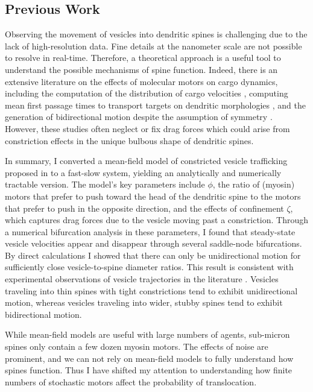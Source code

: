 \documentclass[a4paper,11pt]{article}
\begin{document}
\subsection{Previous Work}

Observing the movement of vesicles into dendritic spines is challenging due to the lack of high-resolution data. Fine details at the nanometer scale are not possible to resolve in real-time. Therefore, a theoretical approach is a useful tool to understand the possible mechanisms of spine function. Indeed, there is an extensive literature on the effects of molecular motors on cargo dynamics, including the computation of the distribution of cargo velocities \cite{muller2008tug,kunwar2011mechanical}, computing mean first passage times to transport targets on dendritic morphologies \cite{bressloff2009directed,newby2009directed,newby2010random,newby2011asymptotic,bressloff2013metastability}, and the generation of bidirectional motion despite the assumption of symmetry \cite{julicher1995cooperative,guerin2011motion,allard2019bidirectional,portet2019deciphering}. However, these studies often neglect or fix drag forces which could arise from constriction effects in the unique bulbous shape of dendritic spines.

In summary, I converted a mean-field model of constricted vesicle trafficking proposed in \cite{fai2017active} to a fast-slow system, yielding an analytically and numerically tractable version. The model's key parameters include $\phi$, the ratio of (myosin) motors that prefer to push toward the head of the dendritic spine to the motors that prefer to push in the opposite direction, and the effects of confinement $\zeta$, which captures drag forces due to the vesicle moving past a constriction. Through a numerical bifurcation analysis in these parameters, I found that steady-state vesicle velocities appear and disappear through several saddle-node bifurcations. By direct calculations I showed that there can only be unidirectional motion for sufficiently close vesicle-to-spine diameter ratios. This result is consistent with experimental observations of vesicle trajectories in the literature \cite{park2020dynamics}. Vesicles traveling into thin spines with tight constrictions tend to exhibit unidirectional motion, whereas vesicles traveling into wider, stubby spines tend to exhibit bidirectional motion.

While mean-field models are useful with large numbers of agents, sub-micron spines only contain a few dozen myosin motors. The effects of noise are prominent, and we can not rely on mean-field models to fully understand how spines function. Thus I have shifted my attention to understanding how finite numbers of stochastic motors affect the probability of translocation.
\end{document}
